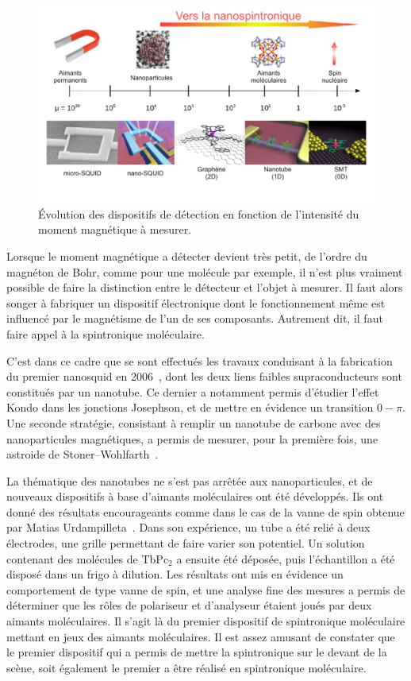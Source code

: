 \begin{figure}
\centering \includegraphics[scale=0.45]{Spintronique/Group1/Group1.pdf}
\caption{\'Evolution des dispositifs de détection en fonction de l'intensité du moment magnétique à mesurer.}
\label{Group1}
\end{figure}



Lorsque le moment magnétique a détecter devient très petit, de l'ordre du magnéton de Bohr, comme pour une molécule par exemple, il n'est plus vraiment possible de faire la distinction entre le détecteur et l'objet à mesurer. Il faut alors songer à fabriquer un dispositif électronique dont le fonctionnement même est influencé par le magnétisme de l'un de ses composants. Autrement dit, il faut faire appel à la spintronique moléculaire.

C'est dans ce cadre que se sont effectués les travaux conduisant à la fabrication du premier nanosquid en 2006~\cite{CleuziouJ.-P.2006}, dont les deux liens faibles supraconducteurs sont constitués par un nanotube. Ce dernier a notamment permis d'étudier l'effet Kondo dans les jonctions Josephson, et de mettre en évidence un transition $0-\pi$. Une seconde stratégie, consistant à remplir un nanotube de carbone avec des nanoparticules magnétiques, a permis de mesurer, pour la première fois, une astroide de Stoner–Wohlfarth~\cite{Cleuziou2011}.

La thématique des nanotubes ne s'est pas arrêtée aux nanoparticules, et de nouveaux dispositifs à base d'aimants moléculaires ont été développés. Ils ont donné des résultats encourageants comme dans le cas de la vanne de spin obtenue par Matias Urdampilleta~\cite{Urdampilleta2011}. Dans son expérience, un tube a été relié à deux électrodes, une grille permettant de faire varier son potentiel. Un solution contenant des molécules de TbPc$_{2}$ a ensuite été déposée, puis l'échantillon a été disposé dans un frigo à dilution. Les résultats ont mis en évidence un comportement de type vanne de spin, et une analyse fine des mesures a permis de déterminer que les rôles de polariseur et d'analyseur étaient joués par deux aimants moléculaires. Il s'agit là du premier dispositif de spintronique moléculaire mettant en jeux des aimants moléculaires. Il est assez amusant de constater que le premier dispositif qui a permis de mettre la spintronique sur le devant de la scène, soit également le premier a être réalisé en spintronique moléculaire.

